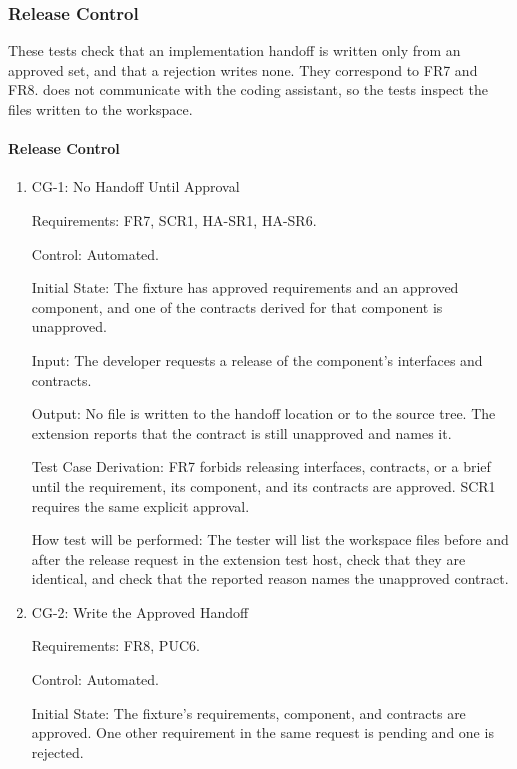 \documentclass[12pt, titlepage]{article}
\begin{document}
\subsubsection{Release Control}

These tests check that an implementation handoff is written only from an
approved set, and that a rejection writes none. They correspond to FR7 and
FR8. \progname{} does not communicate with the coding assistant, so the tests
inspect the files written to the workspace.

\paragraph{Release Control}

\begin{enumerate}

\item{CG-1: No Handoff Until Approval\\}

Requirements: FR7, SCR1, HA-SR1, HA-SR6.

Control: Automated.

Initial State: The fixture has approved requirements and an approved
component, and one of the contracts derived for that component is
unapproved.

Input: The developer requests a release of the component's interfaces and
contracts.

Output: No file is written to the handoff location or to the source tree.
The extension reports that the contract is still unapproved and names it.

Test Case Derivation: FR7 forbids releasing interfaces, contracts, or a brief
until the requirement, its component, and its contracts are approved. SCR1
requires the same explicit approval.

How test will be performed: The tester will list the workspace files before
and after the release request in the extension test host, check that they
are identical, and check that the reported reason names the unapproved
contract.

\item{CG-2: Write the Approved Handoff\\}

Requirements: FR8, PUC6.

Control: Automated.

Initial State: The fixture's requirements, component, and contracts are
approved. One other requirement in the same request is pending and one is
rejected.


\end{enumerate}
\end{document}
